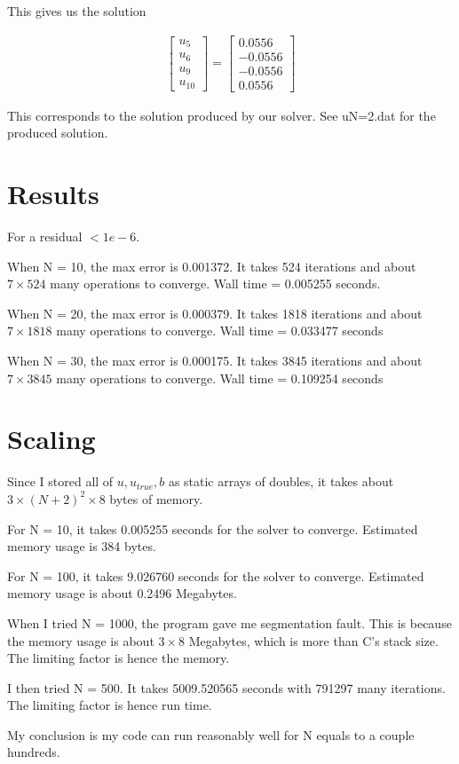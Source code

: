 \documentclass{amsart} %
\begin{document}
This gives us the solution 

\begin{gather}
\begin{bmatrix} u_5 \\ u_6 \\ u_9 \\ u_{10} \end{bmatrix}
=
\begin{bmatrix}
0.0556 \\ -0.0556 \\ -0.0556 \\ 0.0556
\end{bmatrix}
\end{gather}

This corresponds to the solution produced by our solver. See u\textunderscore N=2.dat for the produced solution. 

\section{Results}
For a residual $< 1e-6$. 

When N = 10, the max error is 0.001372. It takes 524 iterations and about $7 \times 524$ many operations to converge. Wall time = 0.005255 seconds.

When N = 20, the max error is 0.000379. It takes 1818 iterations and about $7 \times 1818$ many operations to converge. Wall time = 0.033477 seconds

When N = 30, the max error is 0.000175. It takes 3845 iterations and about $7 \times 3845$ many operations to converge. Wall time = 0.109254 seconds


\section{Scaling}
Since I stored all of $u, u_{true}, b$ as static arrays of doubles, it takes about $3 \times (N+2)^2 \times 8$ bytes of memory.  

For N = 10, it takes 0.005255 seconds for the solver to converge. Estimated memory usage is 384 bytes.

For N = 100, it takes 9.026760 seconds for the solver to converge. Estimated memory usage is about 0.2496 Megabytes.

When I tried N = 1000, the program gave me segmentation fault. This is because the memory usage is about $3 \times 8$ Megabytes, which is more than C's stack size. The limiting factor is hence the memory.

I then tried N = 500. It takes 5009.520565 seconds with 791297 many iterations. The limiting factor is hence run time.

My conclusion is my code can run reasonably well for N equals to a couple hundreds.   


\end{document}
